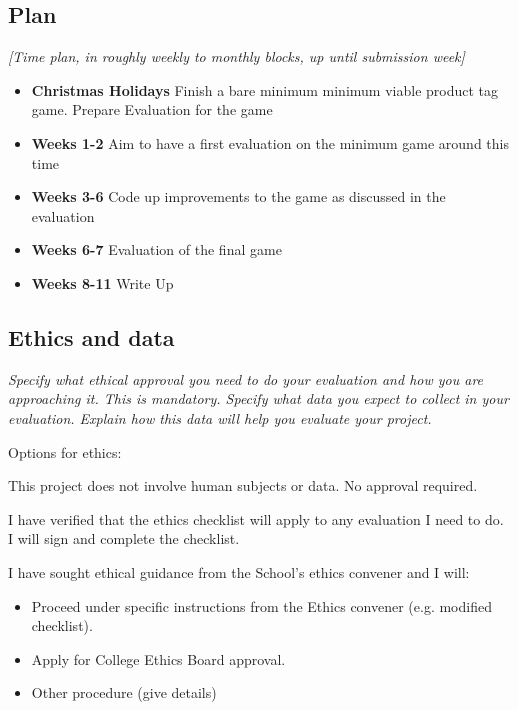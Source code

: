 \documentclass[11pt]{article}
\begin{document}
\subsection{Plan}\label{plan}

\emph{{[}Time plan, in roughly weekly to monthly blocks, up until
submission week{]}}

\begin{itemize}
    \tightlist
    \item \textbf{Christmas Holidays} Finish a bare minimum minimum viable product tag game. Prepare Evaluation for the game
    \item \textbf{Weeks 1-2} Aim to have a first evaluation on the minimum game around this time
    \item \textbf{Weeks 3-6} Code up improvements to the game as discussed in the evaluation
    \item \textbf{Weeks 6-7} Evaluation of the final game
    \item \textbf{Weeks 8-11} Write Up 
\end{itemize}


    
\subsection{Ethics and data}\label{ethics}
\emph{Specify what ethical approval you need to do your evaluation and how you are approaching it. This is mandatory. 
Specify what data you expect to collect in your evaluation. Explain how this data will help you evaluate your project.
}

Options for ethics:
\item This project does not involve human subjects or data. No approval required.
\item I have verified that the ethics checklist will apply to any evaluation I need to do. I will sign and complete the checklist.
\item I have sought ethical guidance from the School's ethics convener and I will:
\begin{itemize}
    \item Proceed under specific instructions from the Ethics convener (e.g. modified checklist).
    \item Apply for College Ethics Board approval.
    \item Other procedure (give details)
\end{itemize}    
\end{document}
